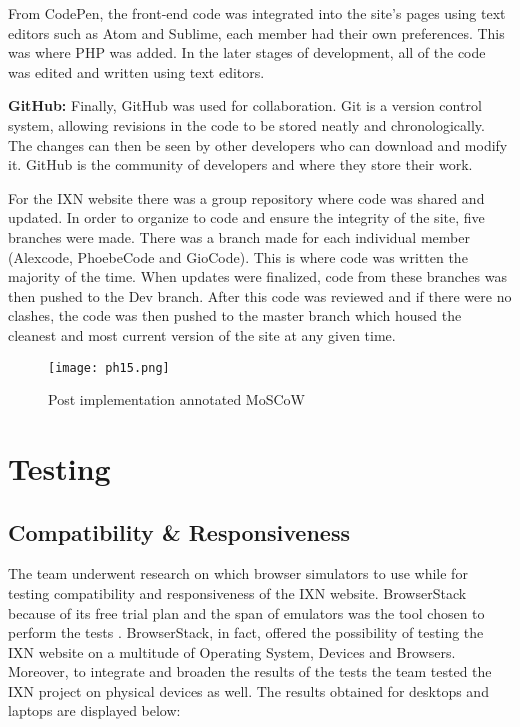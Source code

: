 From CodePen, the front-end code was integrated into the site's pages
using text editors such as Atom and Sublime, each member had their own
preferences. This was where PHP was added. In the later stages of
development, all of the code was edited and written using text editors.

\textbf{GitHub:} Finally, GitHub was used for collaboration. Git is a
version control system, allowing revisions in the code to be stored
neatly and chronologically. The changes can then be seen by other
developers who can download and modify it. \cite{p20} GitHub is the
community of developers and where they store their work.

For the IXN website there was a group repository where code was shared
and updated. In order to organize to code and ensure the integrity of
the site, five branches were made. There was a branch made for each
individual member (Alexcode, PhoebeCode and GioCode). This is where code
was written the majority of the time. When updates were finalized, code
from these branches was then pushed to the Dev branch. After this code
was reviewed and if there were no clashes, the code was then pushed to
the master branch which housed the cleanest and most current version of
the site at any given time.

\begin{figure}[H]
      \centering
      \texttt{[image: ph15.png]}
      \caption{Post implementation annotated MoSCoW}
 \end{figure}

\hypertarget{testing}{%
\section{Testing}\label{testing}}

\hypertarget{compatibility-responsiveness}{%
\subsection{Compatibility \&
Responsiveness}\label{compatibility-responsiveness}}

The team underwent research on which browser simulators to use while for
testing compatibility and responsiveness of the IXN website.
BrowserStack because of its free trial plan and the span of emulators
was the tool chosen to perform the tests \cite{g6}. BrowserStack, in
fact, offered the possibility of testing the IXN website on a multitude
of Operating System, Devices and Browsers. Moreover, to integrate and
broaden the results of the tests the team tested the IXN project on
physical devices as well. The results obtained for desktops and laptops
are displayed below:

